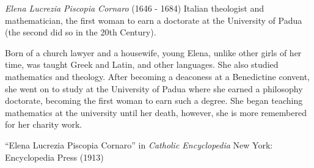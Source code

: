 \documentclass[12pt]{article}
\begin{document}

\emph{Elena Lucrezia Piscopia Cornaro} (1646 - 1684) Italian theologist and mathematician, the first woman to earn a doctorate at the University of Padua (the second did so in the 20th Century).

Born of a church lawyer and a housewife, young Elena, unlike other girls of her time, was taught Greek and Latin, and other languages. She also studied mathematics and theology.
After becoming a deaconess at a Benedictine convent, she went on to study at the University of Padua where she earned a philosophy doctorate, becoming the first woman to earn such a degree. She began teaching mathematics at the university until her death, however, she is more remembered for her charity work.

\begin{thebibliography}{1}
 ``Elena Lucrezia Piscopia Cornaro'' in {\it Catholic Encyclopedia} New York: Encyclopedia Press (1913)
\end{thebibliography}
\end{document}

